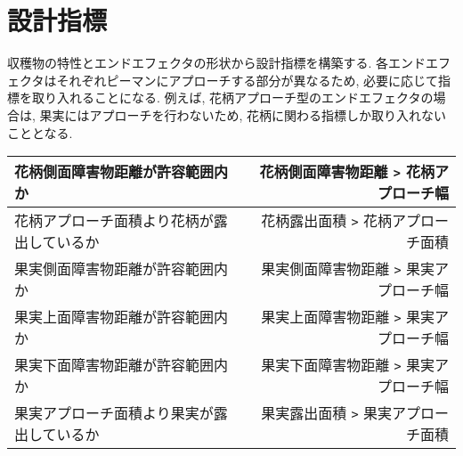 \section{設計指標}
収穫物の特性とエンドエフェクタの形状から設計指標を構築する.
各エンドエフェクタはそれぞれピーマンにアプローチする部分が異なるため, 必要に応じて指標を取り入れることになる.
例えば, 花柄アプローチ型のエンドエフェクタの場合は, 果実にはアプローチを行わないため, 花柄に関わる指標しか取り入れないこととなる.
\begin{center}
  \begin{tabular}{|lr|} \hline
    花柄側面障害物距離が許容範囲内か & 花柄側面障害物距離 \verb|>| 花柄アプローチ幅\\ \hline
    花柄アプローチ面積より花柄が露出しているか & 花柄露出面積 \verb|>| 花柄アプローチ面積\\ \hline
    果実側面障害物距離が許容範囲内か & 果実側面障害物距離 \verb|>| 果実アプローチ幅\\ \hline
    果実上面障害物距離が許容範囲内か & 果実上面障害物距離 \verb|>| 果実アプローチ幅\\ \hline
    果実下面障害物距離が許容範囲内か & 果実下面障害物距離 \verb|>| 果実アプローチ幅\\ \hline
    果実アプローチ面積より果実が露出しているか & 果実露出面積 \verb|>| 果実アプローチ面積\\ \hline
  \end{tabular}
  \end{center}